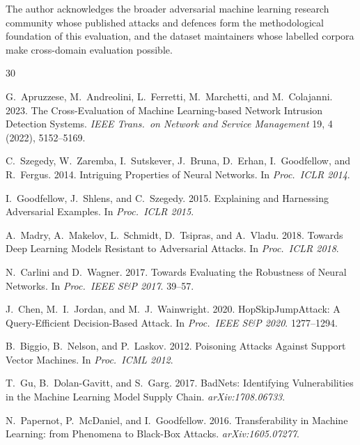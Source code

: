\documentclass[sigconf,nonacm]{acmart}
\begin{document}
\begin{acks}
The author acknowledges the broader adversarial machine learning research
community whose published attacks and defences form the methodological
foundation of this evaluation, and the dataset maintainers whose labelled
corpora make cross-domain evaluation possible.
\end{acks}

\sloppy

\begin{thebibliography}{30}

G.~Apruzzese, M.~Andreolini, L.~Ferretti, M.~Marchetti, and M.~Colajanni. 2023.
The Cross-Evaluation of Machine Learning-based Network Intrusion Detection
Systems. \textit{IEEE Trans.\ on Network and Service Management} 19, 4 (2022),
5152--5169.

C.~Szegedy, W.~Zaremba, I.~Sutskever, J.~Bruna, D.~Erhan, I.~Goodfellow, and
R.~Fergus. 2014. Intriguing Properties of Neural Networks.
In \textit{Proc.\ ICLR 2014}.

I.~Goodfellow, J.~Shlens, and C.~Szegedy. 2015. Explaining and Harnessing
Adversarial Examples. In \textit{Proc.\ ICLR 2015}.

A.~Madry, A.~Makelov, L.~Schmidt, D.~Tsipras, and A.~Vladu. 2018. Towards
Deep Learning Models Resistant to Adversarial Attacks.
In \textit{Proc.\ ICLR 2018}.

N.~Carlini and D.~Wagner. 2017. Towards Evaluating the Robustness of Neural
Networks. In \textit{Proc.\ IEEE S\&P 2017}. 39--57.

J.~Chen, M.~I.~Jordan, and M.~J.~Wainwright. 2020. HopSkipJumpAttack: A
Query-Efficient Decision-Based Attack. In \textit{Proc.\ IEEE S\&P 2020}.
1277--1294.

B.~Biggio, B.~Nelson, and P.~Laskov. 2012. Poisoning Attacks Against Support
Vector Machines. In \textit{Proc.\ ICML 2012}.

T.~Gu, B.~Dolan-Gavitt, and S.~Garg. 2017. BadNets: Identifying Vulnerabilities
in the Machine Learning Model Supply Chain. \textit{arXiv:1708.06733}.

N.~Papernot, P.~McDaniel, and I.~Goodfellow. 2016. Transferability in Machine
Learning: from Phenomena to Black-Box Attacks. \textit{arXiv:1605.07277}.


\end{thebibliography}
\end{document}
